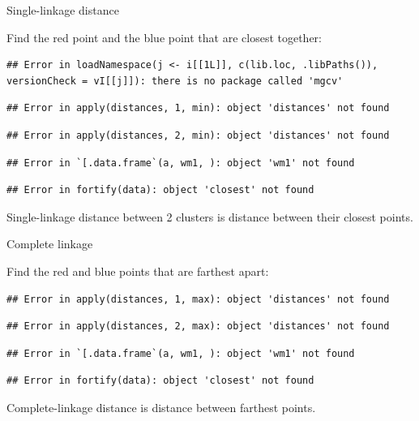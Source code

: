 \documentclass[ignorenonframetext,]{beamer}
\begin{document}
\begin{frame}[fragile]{Single-linkage distance}
\protect\hypertarget{single-linkage-distance}{}

Find the red point and the blue point that are closest together:

\begin{verbatim}
## Error in loadNamespace(j <- i[[1L]], c(lib.loc, .libPaths()), versionCheck = vI[[j]]): there is no package called 'mgcv'
\end{verbatim}

\begin{verbatim}
## Error in apply(distances, 1, min): object 'distances' not found
\end{verbatim}

\begin{verbatim}
## Error in apply(distances, 2, min): object 'distances' not found
\end{verbatim}

\begin{verbatim}
## Error in `[.data.frame`(a, wm1, ): object 'wm1' not found
\end{verbatim}

\begin{verbatim}
## Error in fortify(data): object 'closest' not found
\end{verbatim}

Single-linkage distance between 2 clusters is distance between their
closest points.

\end{frame}

\begin{frame}[fragile]{Complete linkage}
\protect\hypertarget{complete-linkage}{}

Find the red and blue points that are farthest apart:

\begin{verbatim}
## Error in apply(distances, 1, max): object 'distances' not found
\end{verbatim}

\begin{verbatim}
## Error in apply(distances, 2, max): object 'distances' not found
\end{verbatim}

\begin{verbatim}
## Error in `[.data.frame`(a, wm1, ): object 'wm1' not found
\end{verbatim}

\begin{verbatim}
## Error in fortify(data): object 'closest' not found
\end{verbatim}

Complete-linkage distance is distance between farthest points.

\end{frame}
\end{document}
